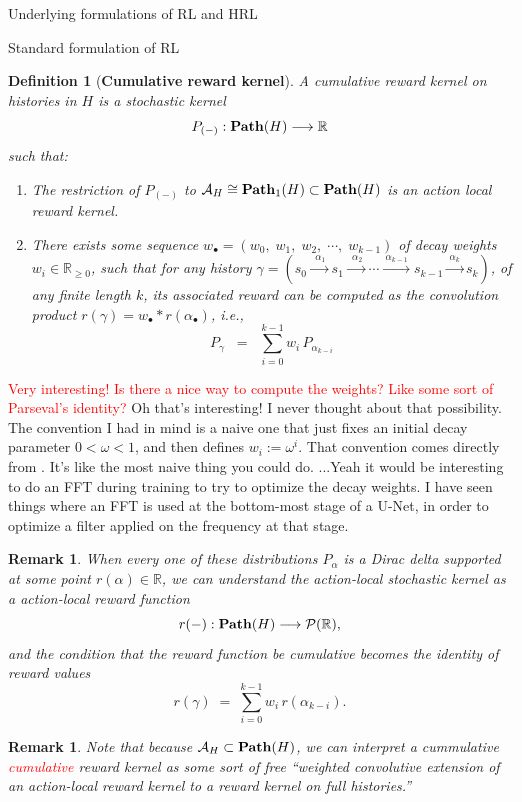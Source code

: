 \documentclass[11pt]{article}
\newtheorem{definition}[subsubsection]{Definition}
\newtheorem{remark}[subsubsection]{Remark}
\begin{document}
\begin{section}{Underlying formulations of RL and HRL}
\begin{subsection}{Standard formulation of RL}
\begin{definition}[{\bf Cumulative reward kernel}]
A {\em cumulative reward kernel} on histories in $H$ is a stochastic kernel
$$
P_{(-)}:\bold{Path}(H)\longrightarrow \mathbb{R}
$$
such that:
\begin{enumerate}
\item
The restriction of $P_{(-)}$ to $\mathcal{A}_{H}\cong\bold{Path}_{1}(H)\subset\bold{Path}(H)$ is an action local reward kernel.
\item
There exists some sequence $w_{\bullet}=(w_{0}, \;w_{1},\;w_{2},\;\cdots,\;w_{k-1})$ of {\em decay weights} $w_{i}\in\mathbb{R}_{\ge0}$, such that for any history $\gamma=(s_{0}\xrightarrow{\ \ \alpha_{1}\ }s_{1}\xrightarrow{\ \ \alpha_{2}\ }\cdots\xrightarrow{\ \alpha_{k-1}\ }s_{k-1}\xrightarrow{\ \alpha_{k}\ }s_{k})$, of any finite length $k$, its associated reward can be computed as the convolution product $r(\gamma)=w_{\bullet}\ast r(\alpha_{\bullet})$, i.e.,
$$
    P_{\gamma}\;\;=\;\;\sum_{i=0}^{k-1} w_{i}\,P_{\alpha_{k-i}}
$$
\end{enumerate}
\end{definition}
\textcolor{red}{Very interesting! Is there a nice way to compute the weights? Like some sort of Parseval's identity?} {\color{blue} Oh that's interesting! I never thought about that possibility. The convention I had in mind is a naive one that just fixes an initial decay parameter $0<\omega<1$, and then defines $w_{i}:=\omega^{i}$. That convention comes directly from \cite{SBRL}. It's like the most naive thing you could do. ...Yeah it would be interesting to do an FFT during training to try to optimize the decay weights. I have seen things where an FFT is used at the bottom-most stage of a U-Net, in order to optimize a filter applied on the frequency at that stage.}
\begin{remark}
\normalfont
When every one of these distributions $P_{\!\alpha}$ is a Dirac delta supported at some point $r(\alpha)\in\mathbb{R}$, we can understand the action-local stochastic kernel as a {\em action-local reward function}
$$
r(-):\bold{Path}(H)\longrightarrow\mathcal{P}(\mathbb{R}),
$$
and the condition that the reward function be cumulative becomes the identity of reward values
$$
    r(\gamma)\;=\;\sum_{i=0}^{k-1} w_{i}\,r(\alpha_{k-i}).
$$
\end{remark}

\begin{remark}
\normalfont
Note that because $\mathcal{A}_{H}\subset\bold{Path}(H)$, we can interpret a cummulative \textcolor{red}{cumulative} reward kernel as some sort of free ``weighted convolutive extension of an action-local reward kernel to a reward kernel on full histories.''


\end{remark}
\end{subsection}
\end{section}
\end{document}
